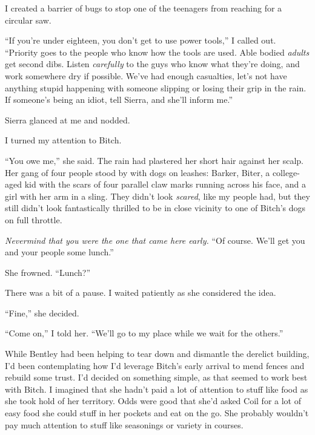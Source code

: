 I created a barrier of bugs to stop one of the teenagers from reaching for a circular saw.



``If you're under eighteen, you don't get to use power tools,'' I called out.  ``Priority goes to the people who know how the tools are used.  Able bodied \emph{adults} get second dibs.  Listen \emph{carefully} to the guys who know what they're doing, and work somewhere dry if possible.  We've had enough casualties, let's not have anything stupid happening with someone slipping or losing their grip in the rain.  If someone's being an idiot, tell Sierra, and she'll inform me.''



Sierra glanced at me and nodded.



I turned my attention to Bitch.



``You owe me,'' she said.  The rain had plastered her short hair against her scalp.  Her gang of four people stood by with dogs on leashes: Barker, Biter, a college-aged kid with the scars of four parallel claw marks running across his face, and a girl with her arm in a sling.  They didn't look \emph{scared}, like my people had, but they still didn't look fantastically thrilled to be in close vicinity to one of Bitch's dogs on full throttle.



\emph{Nevermind that you were the one that came here early. } ``Of course.  We'll get you and your people some lunch.''



She frowned.  ``Lunch?''



There was a bit of a pause.  I waited patiently as she considered the idea.



``Fine,'' she decided.



``Come on,'' I told her.  ``We'll go to my place while we wait for the others.''



While Bentley had been helping to tear down and dismantle the derelict building, I'd been contemplating how I'd leverage Bitch's early arrival to mend fences and rebuild some trust.  I'd decided on something simple, as that seemed to work best with Bitch.  I imagined that she hadn't paid a lot of attention to stuff like food as she took hold of her territory.  Odds were good that she'd asked Coil for a lot of easy food she could stuff in her pockets and eat on the go.  She probably wouldn't pay much attention to stuff like seasonings or variety in courses.




